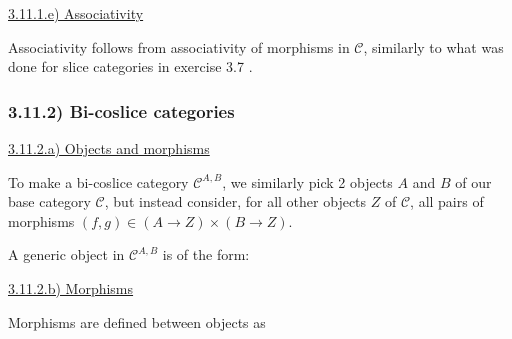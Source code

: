 \documentclass[12pt, letterpaper, twoside]{report}
\begin{document}
\vspace{5mm}
\underline{3.11.1.e) Associativity}

Associativity follows from associativity of morphisms in $\mathcal{C}$, similarly to what was done for slice categories in exercise 3.7 .



\subsubsection*{3.11.2) Bi-coslice categories}

\vspace{5mm}
\underline{3.11.2.a) Objects and morphisms}

To make a bi-coslice category $\mathcal{C}^{A,B}$, we similarly pick 2 objects $A$ and $B$ of our base category $\mathcal{C}$, but instead consider, for all other objects $Z$ of $\mathcal{C}$, all pairs of morphisms $(f, g) \in (A \to Z) \times (B \to Z)$.

A generic object in $\mathcal{C}^{A,B}$ is of the form:



\vspace{5mm}
\underline{3.11.2.b) Morphisms}

Morphisms are defined between objects as

\end{document}
